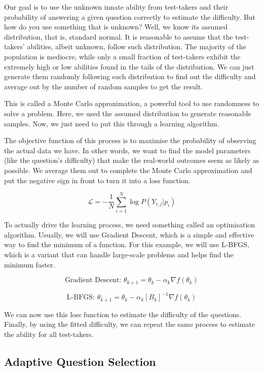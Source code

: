 \documentclass{article}
\begin{document}
Our goal is to use the unknown innate ability from test-takers and their probability of answering a given question correctly to estimate the difficulty. But how do you use something that is unknown? Well, we know its assumed distribution, that is, standard normal. It is reasonable to assume that the test-takers' abilities, albeit unknown, follow such distribution. The majority of the population is mediocre, while only a small fraction of test-takers exhibit the extremely high or low abilities found in the tails of the distribution. We can just generate them randomly following such distribution to find out the difficulty and average out by the number of random samples to get the result.

This is called a Monte Carlo approximation, a powerful tool to use randomness to solve a problem. Here, we used the assumed distribution to generate reasonable samples. Now, we just need to put this through a learning algorithm.

The objective function of this process is to maximise the probability of observing the actual data we have. In other words, we want to find the model parameters (like the question's difficulty) that make the real-world outcomes seem as likely as possible. We average them out to complete the Monte Carlo approximation and put the negative sign in front to turn it into a loss function.

\[
\mathcal{L} = -\frac{1}{N} \sum_{i=1}^{N}\log P(Y_{i,j} | p_i)
\]

To actually drive the learning process, we need something called an optimisation algorithm. Usually, we will use Gradient Descent, which is a simple and effective way to find the minimum of a function. For this example, we will use L-BFGS, which is a variant that can handle large-scale problems and helps find the minimum faster.

\[
\text{Gradient Descent: } \theta_{k+1} = \theta_k - \alpha_k \nabla f(\theta_k)
\]

\[
\text{L-BFGS: } \theta_{k+1} = \theta_k - \alpha_k [B_k]^{-1} \nabla f(\theta_k)
\]

We can now use this loss function to estimate the difficulty of the questions. Finally, by using the fitted difficulty, we can repeat the same process to estimate the ability for all test-takers.

\subsection*{Adaptive Question Selection}
\end{document}

